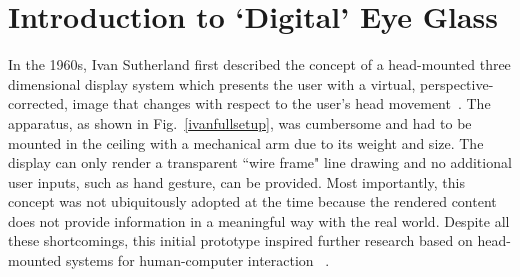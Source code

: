 \section{Introduction to `Digital' Eye Glass}
\label{introdigitalglass}

In the 1960s, Ivan Sutherland first described the concept of a head-mounted three dimensional 
display system which presents the user with a virtual, perspective-corrected, image that changes with 
respect to the user's head movement~\cite{sutherland1968head}. The apparatus, as shown in 
Fig.~\ref{ivanfullsetup}, was cumbersome and had to be mounted in the ceiling with a mechanical arm 
due to its weight and size. The display can only render a transparent ``wire frame" line drawing and no 
additional user inputs, such as hand gesture, can be provided. Most importantly, this concept was not 
ubiquitously adopted at the time because the rendered content does not provide information in a 
meaningful way with the real world. Despite all these shortcomings, this initial prototype inspired 
further research based on head-mounted systems for human-computer interaction 
~\cite{feiner1993knowledge,feiner1997touring,caudell1992augmented,stoakley1995virtual,billinghurst2015rapid,kato1999marker,billinghurst2002augmented}.


